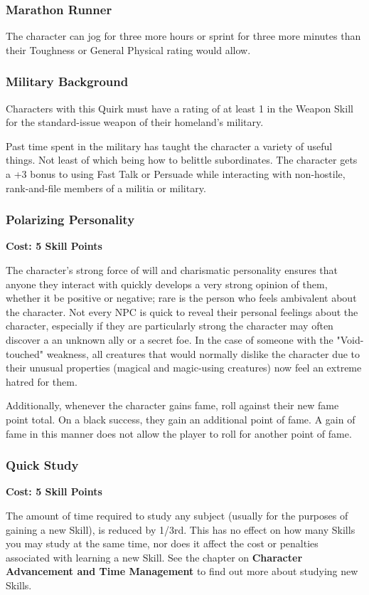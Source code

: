 \documentclass[oneside]{book}
\begin{document}
\begin{multicols}{2}
\subsubsection{Marathon Runner}
The character can jog for three more hours or sprint for three more minutes than their Toughness or General Physical rating would allow. 

\subsubsection{Military Background}
Characters with this Quirk must have a rating of at least 1 in the Weapon Skill for the standard-issue weapon of their homeland's military. 

Past time spent in the military has taught the character a variety of useful things. Not least of which being how to belittle subordinates. The character gets a +3 bonus to using Fast Talk or Persuade while interacting with non-hostile, rank-and-file members of a militia or military. 

\subsubsection{Polarizing Personality}
\textbf{\small Cost: 5 Skill Points}

The character's strong force of will and charismatic personality ensures that anyone they interact with quickly develops a very strong opinion of them, whether it be positive or negative; rare is the person who feels ambivalent about the character. Not every NPC is quick to reveal their personal feelings about the character, especially if they are particularly strong the character may often discover a an unknown ally or a secret foe. In the case of someone with the "Void-touched" weakness, all creatures that would normally dislike the character due to their unusual properties (magical and magic-using creatures) now feel an extreme hatred for them.

Additionally, whenever the character gains fame, roll against their new fame point total. On a black success, they gain an additional point of fame. A gain of fame in this manner does not allow the player to roll for another point of fame.

\subsubsection{Quick Study}
\textbf{\small Cost: 5 Skill Points}

The amount of time required to study any subject (usually for the purposes of gaining a new Skill), is reduced by 1/3rd. This has no effect on how many Skills you may study at the same time, nor does it affect the cost or penalties associated with learning a new Skill. See the chapter on \textbf{Character Advancement and Time Management} to find out more about studying new Skills.


\end{multicols}
\end{document}
